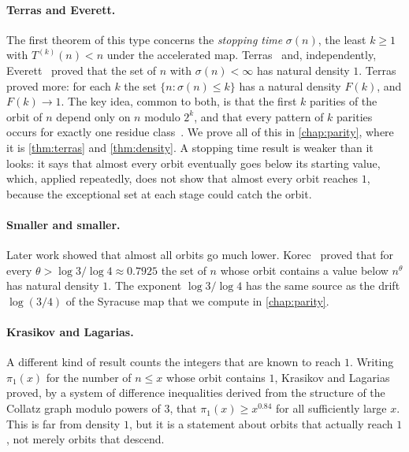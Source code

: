 \paragraph{Terras and Everett.} The first theorem of this type concerns the
\emph{stopping time} $\sigma(n)$, the least $k\geq1$ with $T^{(k)}(n)<n$ under
the accelerated map. Terras~\cite{terras1976,terras1979} and, independently,
Everett~\cite{everett1977} proved that the set of $n$ with $\sigma(n)<\infty$
has natural density $1$. Terras proved more: for each $k$ the set
$\{n:\sigma(n)\leq k\}$ has a natural density $F(k)$, and $F(k)\to1$. The key
idea, common to both, is that the first $k$ parities of the orbit of $n$ depend only on $n$
modulo $2^k$, and that every pattern of $k$ parities occurs for exactly one
residue class~\cite[Theorem~B]{lagarias1985}. We prove all of this in \cref{chap:parity}, where it is
\cref{thm:terras} and \cref{thm:density}. A stopping time result is weaker than
it looks: it says that almost every orbit eventually goes below its starting
value, which, applied repeatedly, does not show that almost every orbit reaches
$1$, because the exceptional set at each stage could catch the orbit.

\paragraph{Smaller and smaller.} Later work showed that almost all orbits go
much lower. Korec~\cite{korec1994} proved that for every
$\theta>\log3/\log4\approx0.7925$ the set of $n$ whose orbit contains a value
below $n^{\theta}$ has natural density $1$. The exponent $\log3/\log4$ has the
same source as the drift $\log(3/4)$ of the Syracuse map that we compute in
\cref{chap:parity}.

\paragraph{Krasikov and Lagarias.} A different kind of result counts the
integers that are known to reach $1$. Writing $\pi_1(x)$ for the number of
$n\leq x$ whose orbit contains $1$, Krasikov and Lagarias~\cite{krasikov2003}
proved, by a system of difference inequalities derived from the structure of
the Collatz graph modulo powers of $3$, that $\pi_1(x)\geq x^{0.84}$ for all
sufficiently large $x$. This is far from density $1$, but it is a statement
about orbits that actually reach $1$, not merely orbits that descend.

